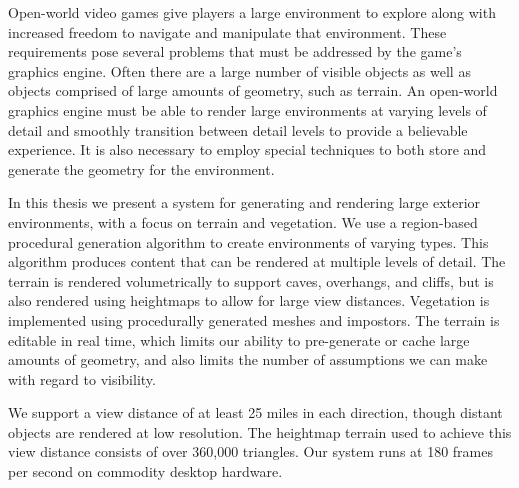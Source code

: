 Open-world video games give players a large environment to explore along with increased freedom to navigate and manipulate that environment.
These requirements pose several problems that must be addressed by the game's graphics engine.
Often there are a large number of visible objects as well as objects comprised of large amounts of geometry, such as terrain.
An open-world graphics engine must be able to render large environments at varying levels of detail and smoothly transition between detail levels to provide a believable experience.
It is also necessary to employ special techniques to both store and generate the geometry for the environment.

In this thesis we present a system for generating and rendering large exterior environments, with a focus on terrain and vegetation.
We use a region-based procedural generation algorithm to create environments of varying types.
This algorithm produces content that can be rendered at multiple levels of detail.
The terrain is rendered volumetrically to support caves, overhangs, and cliffs, but is also rendered using heightmaps to allow for large view distances.
Vegetation is implemented using procedurally generated meshes and impostors.
The terrain is editable in real time, which limits our ability to pre-generate or cache large amounts of geometry, and also limits the number of assumptions we can make with regard to visibility.

We support a view distance of at least 25 miles in each direction, though distant objects are rendered at low resolution.
The heightmap terrain used to achieve this view distance consists of over 360,000 triangles.
Our system runs at 180 frames per second on commodity desktop hardware.
